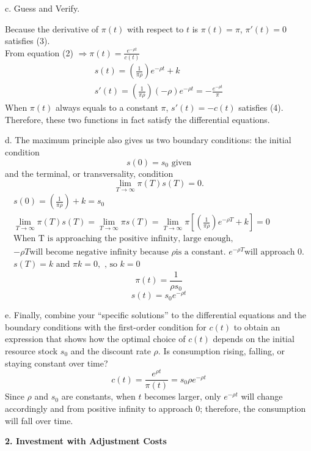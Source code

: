 \documentclass[12pt]{article}
\begin{document}
\begin{description}
\item c. Guess and Verify. 

Because the derivative of $\pi(t)$ with respect to $t$ is $\pi(t) = \pi$,  $\pi'(t) = 0$ satisfies (3). \\
From equation (2) $ \Rightarrow  \pi(t) = \frac{e^{-\rho t}}{c(t)}$
\begin{gather*}
    s(t) = \left( \frac{1}{\pi \rho} \right) e^{-\rho t} + k \\ 
    s'(t) = \left( \frac{1}{\pi \rho} \right) (-\rho) e^{-\rho t} = -\frac{e^{-\rho t}}{\pi}  
\end{gather*}
When $\pi(t)$ always equals to a constant $\pi$, $s'(t) = -c(t)$ satisfies (4). Therefore, these two functions in fact satisfy the differential equations. 

\item d. The maximum principle also gives us two boundary conditions: the initial condition
$$
s(0) = s_{0} \text{ given}
$$
and the terminal, or transversality, condition
$$
\lim_{T \rightarrow \infty} \pi(T)s(T) = 0.
$$
\begin{gather*}
    s(0) = \left( \frac{1}{\pi \rho} \right) + k = s_0  \\ 
    \lim_{T \rightarrow \infty} \pi(T)s(T) = \lim_{T \rightarrow \infty} \pi s(T) = \lim_{T \rightarrow \infty} \pi [\left( \frac{1}{\pi \rho} \right) e^{-\rho T} + k] = 0 \\ 
    \text{When T is approaching the positive infinity, large enough, } \\
    -\rho T \text{will become negative infinity because } \rho \text{is a constant. } e^{-\rho T} \text{will approach } 0. \\ 
    s(T) = k \text{ and  } \pi k = 0, \text{ , so  }k = 0 
\end{gather*}
\begin{equation}
    \pi(t) = \frac{1}{\rho s_0} 
\end{equation}
\begin{equation}
    s(t) = s_0 e^{-\rho t}
\end{equation}

\item e. Finally, combine your ``specific solutions'' to the differential equations and the boundary conditions with the first-order condition for $c(t)$ to obtain an expression that shows how the optimal choice of $c(t)$ depends on the initial resource stock $s_{0}$ and the discount rate $\rho$. Is consumption rising, falling, or staying constant over time?
$$
c(t) = \frac{e^{\rho t}}{\pi(t)} = s_0\rho e^{-\rho t}
$$
Since $\rho$ and $s_0$ are constants, when $t$ becomes larger, only $e^{-\rho t}$ will change accordingly and from positive infinity to approach 0; therefore, the consumption will fall over time. 
\end{description}
{\bfseries 2. Investment with Adjustment Costs}
\end{document}
